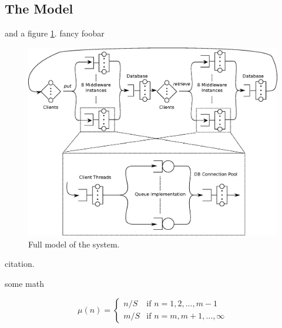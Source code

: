 \subsection{The Model}
and a figure \ref{fig:full_model}.  fancy foobar

\begin{figure}[h!]
\centering
\includegraphics[width=1\textwidth]{figures/full_model.eps}
\caption{Full model of the system.}
\label{fig:full_model}
\end{figure}

\newpage

citation\cite{Raj}. 

some math

\[\mu(n) =
\left\{
	\begin{array}{ll}
		n/S  & \mbox{if } n=1,2,...,m-1 \\
		m/S & \mbox{if } n=m,m+1,...,\infty
	\end{array}
\right.
 \]



